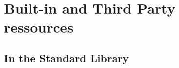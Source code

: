 \documentclass[13pt, usenames,dvipsnames]{beamer} %
\begin{document}








\section{Built-in and Third Party ressources}
    \subsection{In the Standard Library}
\end{document}
